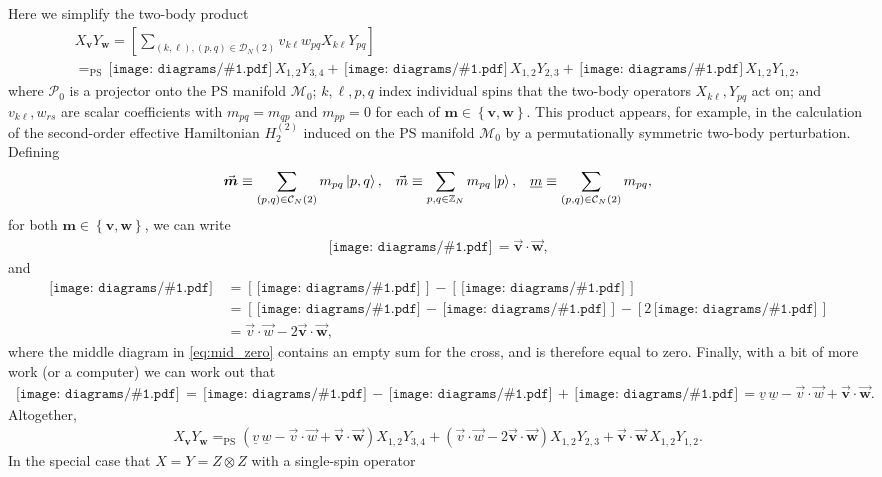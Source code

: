 \documentclass[nofootinbib,notitlepage,11pt]{revtex4-2}
\newcommand{\p}[1]{\left(#1\right)} %
\renewcommand{\sp}[1]{\left[#1\right]} %
\renewcommand{\set}[1]{\left\{#1\right\}} %
\renewcommand{\c}{\cdot} %
\newcommand{\m}{\bm} %
\renewcommand{\v}{\vec} %
\newcommand{\1}{\mathds{1}}
\newcommand{\C}{\mathcal{C}}
\newcommand{\D}{\mathcal{D}}
\newcommand{\M}{\mathcal{M}}
\renewcommand{\P}{\mathcal{P}}
\newcommand{\ZZ}{\mathbb{Z}}
\newcommand{\EQPS}{=_{\text{PS}}}
\newcommand{\col}{\underline}
\newcommand{\diagram}[1]
{\,\texttt{[image: diagrams/\#1.pdf]}\,}
\begin{document}
Here we simplify the two-body product
\begin{multline}
  X_{\m v} Y_{\m w}
  = \sp{\sum_{\p{k,\ell},\p{p,q}\in\D_N\p{2}}
    v_{k\ell} w_{pq} X_{k\ell} Y_{pq}} \\
  \EQPS \diagram{two_body_0} X_{1,2} Y_{3,4} + \diagram{two_body_1}
  X_{1,2} Y_{2,3} + \diagram{two_body_2} X_{1,2} Y_{1,2},
\end{multline}
where $\P_0$ is a projector onto the PS manifold $\M_0$; $k,\ell,p,q$
index individual spins that the two-body operators $X_{k\ell},Y_{pq}$
act on; and $v_{k\ell},w_{rs}$ are scalar coefficients with
$m_{pq}=m_{qp}$ and $m_{pp}=0$ for each of $\m m\in\set{\m v,\m w}$.
This product appears, for example, in the calculation of the
second-order effective Hamiltonian $H_2^{(2)}$ induced on the PS
manifold $\M_0$ by a permutationally symmetric two-body perturbation.
Defining
\begin{align}
  \v{\m m} \equiv \sum_{\p{p,q}\in\C_N\p{2}} m_{pq} \ket{p,q},
  &&
  \v m \equiv \sum_{p,q\in\ZZ_N} m_{pq} \ket{p},
  &&
  \col{m} \equiv \sum_{\p{p,q}\in\C_N\p{2}} m_{pq},
\end{align}
for both $\m m\in\set{\m v,\m w}$, we can write
\begin{align}
  \diagram{two_body_2} = \v{\m v} \c\v{\m w},
\end{align}
and
\begin{align}
  \diagram{two_body_1}
  &= \sp{\diagram{two_body_1_o}} - \sp{\diagram{two_body_1_x}} \\
  &= \sp{\diagram{two_body_1_oo} - \diagram{two_body_1_ox}}
  - \sp{2\diagram{two_body_2}} \label{eq:mid_zero} \\
  &= \v v \c \v w - 2 \v{\m v} \c \v{\m w},
\end{align}
where the middle diagram in \eqref{eq:mid_zero} contains an empty sum
for the cross, and is therefore equal to zero.  Finally, with a bit of
more work (or a computer) we can work out that
\begin{align}
  \diagram{two_body_0}
  = \diagram{two_body_0_oooo} - \diagram{two_body_1_ooo}
  + \diagram{two_body_2_oo}
  = \col{v}\,\col{w} - \v v\c\v w + \v{\m v}\c\v{\m w}.
\end{align}
Altogether,
\begin{align}
  X_{\m v} Y_{\m w}
  \EQPS \p{\col{v}\,\col{w} - \v v\c\v w + \v{\m v}\c\v{\m w}}
  X_{1,2} Y_{3,4}
  + \p{\v v\c\v w - 2 \v{\m v} \c \v{\m w}} X_{1,2} Y_{2,3}
  + \v{\m v} \c \v{\m w}\, X_{1,2} Y_{1,2}.
\end{align}
In the special case that $X=Y=Z\otimes Z$ with a single-spin operator
\end{document}
